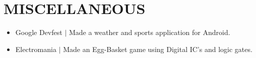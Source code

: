 \documentclass{article}
\begin{document}
 \section*{MISCELLANEOUS}
    \begin{itemize}
        \itemsep0em
        \item Google Devfest $|$ Made a weather and sports application for Android. 
        \item Electromania $|$ Made an Egg-Basket game using Digital IC’s and logic gates.
    \end{itemize}



\end{document}
